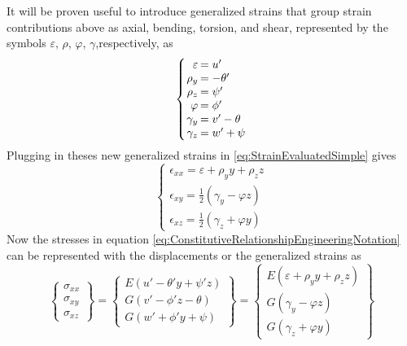 It will be proven useful to introduce generalized strains that group strain contributions above as axial, bending, torsion, and shear, represented by the symbols $ \varepsilon $, $ \rho $, $ \varphi $, $ \gamma $,respectively, as
\begin{equation}\label{eq:GeneralizedStrains}
\left\{\arraycolsep=1pt\begin{array}{rl}
\varepsilon&=u'\\
\rho_{y}&=-\theta'\\
\rho_{z}&=\psi'\\
\varphi&=\phi'\\
\gamma_{y}&=v'-\theta\\
\gamma_{z}&=w'+\psi\end{array}\right.
\end{equation}
Plugging in theses new generalized strains in \eqref{eq:StrainEvaluatedSimple} gives
\begin{equation}\label{eq:StrainEvaluatedSimpleGeneralized}
\left\{\begin{array}{l}
\epsilon_{xx}=\varepsilon+\rho_yy+\rho_zz\\
\epsilon_{xy}=\frac{1}{2}(\gamma_y-\varphi z)\\
\epsilon_{xz}=\frac{1}{2}(\gamma_z+\varphi y)
\end{array}\right.
\end{equation}
Now the stresses in equation \eqref{eq:ConstitutiveRelationshipEngineeringNotation} can be represented with the displacements or the generalized strains as 
\begin{equation}\label{key}
\left\{\begin{array}{c}
\sigma_{xx}\\ \sigma_{xy}\\ \sigma_{xz}
\end{array}\right\} = \left\{\begin{array}{c}
E(u'-\theta'y+\psi'z)\\ G(v'-\phi'z-\theta)\\ G(w'+\phi'y+\psi)
\end{array}\right\} = \left\{\begin{array}{c}
E(\varepsilon+\rho_yy+\rho_zz)\\ G(\gamma_y-\varphi z)\\ G(\gamma_z+\varphi y)
\end{array}\right\}
\end{equation}
